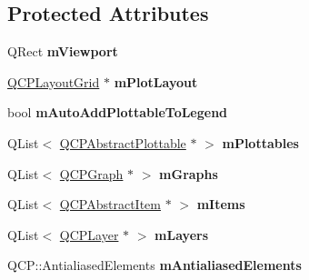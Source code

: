 \subsection*{Protected Attributes}
\begin{DoxyCompactItemize}
\item 
\mbox{\label{class_q_custom_plot_ac0a7c38a715526c257cff95774f83ab6}} 
Q\+Rect {\bfseries m\+Viewport}
\item 
\mbox{\label{class_q_custom_plot_ac97298756882a0eecd98151679850ac1}} 
\mbox{\hyperlink{class_q_c_p_layout_grid}{Q\+C\+P\+Layout\+Grid}} $\ast$ {\bfseries m\+Plot\+Layout}
\item 
\mbox{\label{class_q_custom_plot_aaf3ea6a4cb04d35a149cc9a0cdac3394}} 
bool {\bfseries m\+Auto\+Add\+Plottable\+To\+Legend}
\item 
\mbox{\label{class_q_custom_plot_a62bf8e4e7f8d23fc1e9301ba0148269f}} 
Q\+List$<$ \mbox{\hyperlink{class_q_c_p_abstract_plottable}{Q\+C\+P\+Abstract\+Plottable}} $\ast$ $>$ {\bfseries m\+Plottables}
\item 
\mbox{\label{class_q_custom_plot_adaf8d407d72a725169d7dbed2ee386bb}} 
Q\+List$<$ \mbox{\hyperlink{class_q_c_p_graph}{Q\+C\+P\+Graph}} $\ast$ $>$ {\bfseries m\+Graphs}
\item 
\mbox{\label{class_q_custom_plot_a6a93905372326e31e98d6c3bc8953ec8}} 
Q\+List$<$ \mbox{\hyperlink{class_q_c_p_abstract_item}{Q\+C\+P\+Abstract\+Item}} $\ast$ $>$ {\bfseries m\+Items}
\item 
\mbox{\label{class_q_custom_plot_a72ee313041b873d76c198793ce7e6c37}} 
Q\+List$<$ \mbox{\hyperlink{class_q_c_p_layer}{Q\+C\+P\+Layer}} $\ast$ $>$ {\bfseries m\+Layers}
\item 
\mbox{\label{class_q_custom_plot_aa333200629256830e273873b582a5524}} 
Q\+C\+P\+::\+Antialiased\+Elements {\bfseries m\+Antialiased\+Elements}
\item 
\mbox{\label{class_q_custom_plot_a2b6ebcad00a90ba07f146cefcd4293da}} 

\end{DoxyCompactItemize}
